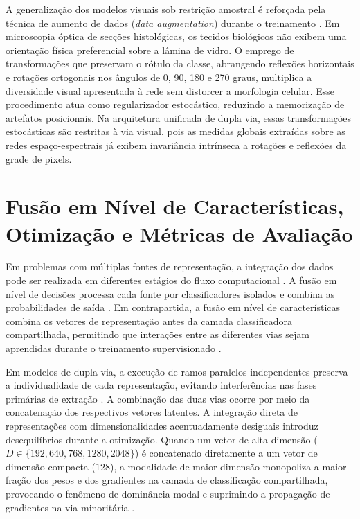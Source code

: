 A generalização dos modelos visuais sob restrição amostral é reforçada pela técnica de aumento de dados (\textit{data augmentation}) durante o treinamento \cite{shorten2019survey,perez2017effectiveness}. Em microscopia óptica de secções histológicas, os tecidos biológicos não exibem uma orientação física preferencial sobre a lâmina de vidro. O emprego de transformações que preservam o rótulo da classe, abrangendo reflexões horizontais e rotações ortogonais nos ângulos de 0, 90, 180 e 270 graus, multiplica a diversidade visual apresentada à rede sem distorcer a morfologia celular. Esse procedimento atua como regularizador estocástico, reduzindo a memorização de artefatos posicionais. Na arquitetura unificada de dupla via, essas transformações estocásticas são restritas à via visual, pois as medidas globais extraídas sobre as redes espaço-espectrais já exibem invariância intrínseca a rotações e reflexões da grade de pixels.

\section{Fusão em Nível de Características, Otimização e Métricas de Avaliação}
\label{sec:fusao-fundamentacao}

Em problemas com múltiplas fontes de representação, a integração dos dados pode ser realizada em diferentes estágios do fluxo computacional \cite{baltrusaitis2019multimodal}. A fusão em nível de decisões processa cada fonte por classificadores isolados e combina as probabilidades de saída \cite{yousaf2024twostream}. Em contrapartida, a fusão em nível de características combina os vetores de representação antes da camada classificadora compartilhada, permitindo que interações entre as diferentes vias sejam aprendidas durante o treinamento supervisionado \cite{ramachandram2017deep,huang2022fusing}.

Em modelos de dupla via, a execução de ramos paralelos independentes preserva a individualidade de cada representação, evitando interferências nas fases primárias de extração \cite{simonyan2014two,wang2023stnet,nawaz2025ard}. A combinação das duas vias ocorre por meio da concatenação dos respectivos vetores latentes. A integração direta de representações com dimensionalidades acentuadamente desiguais introduz desequilíbrios durante a otimização. Quando um vetor de alta dimensão ($D \in \{192, 640, 768, 1280, 2048\}$) é concatenado diretamente a um vetor de dimensão compacta ($128$), a modalidade de maior dimensão monopoliza a maior fração dos pesos e dos gradientes na camada de classificação compartilhada, provocando o fenômeno de dominância modal e suprimindo a propagação de gradientes na via minoritária \cite{baltrusaitis2019multimodal,ramachandram2017deep}.

